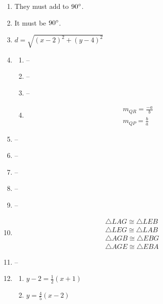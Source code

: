 \documentclass{article}
\begin{document}
\begin{enumerate}
\begin{enumerate}
	\end{enumerate}
	
\item They must add to $90\degree$.

\item It must be $90\degree$.

\item $d = \sqrt{(x - 2)^2 + (y - 4)^2}$

\item
	\begin{enumerate}
	
	\item --
	
	\item --
	
	\item --
	
	\item \begin{gather*}
		m_{QR} = \frac{-a}{b} \\
		m_{QP} = \frac{b}{a}
		\end{gather*}
	
	\end{enumerate}
	
\item --

\item --

\item --

\item --

\item --

\item \begin{gather*}
	\triangle LAG \cong \triangle LEB \\
	\triangle LEG \cong \triangle LAB \\
	\triangle AGB \cong \triangle EBG \\
	\triangle AGE \cong \triangle EBA
	\end{gather*}
	
\item --
	
\item \begin{enumerate}

	\item $y - 2 = \frac{1}{2}(x + 1)$
	
	\item $y = \frac{4}{5}(x - 2)$
	

\end{enumerate}
\end{enumerate}
\end{document}

